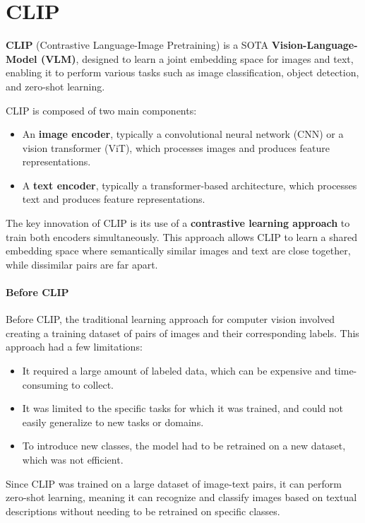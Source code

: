 \section{CLIP}
\textbf{CLIP} (Contrastive Language-Image Pretraining) is a SOTA \textbf{Vision-Language-Model (VLM)}, designed to learn a joint embedding space for images and text, 
enabling it to perform various tasks such as image classification, object detection, and zero-shot learning.

CLIP is composed of two main components:
\begin{itemize}
    \item An \textbf{image encoder}, typically a convolutional neural network (CNN) or a vision transformer (ViT), which processes images and produces feature representations.
    \item A \textbf{text encoder}, typically a transformer-based architecture, which processes text and produces feature representations.
\end{itemize}
The key innovation of CLIP is its use of a \textbf{contrastive learning approach} to train both encoders simultaneously. This approach allows
CLIP to learn a shared embedding space where semantically similar images and text are close together, while dissimilar pairs are far apart.

\paragraph{Before CLIP}
Before CLIP, the traditional learning approach for computer vision involved creating a training dataset of pairs of images and their corresponding labels.
This approach had a few limitations:
\begin{itemize}
    \item It required a large amount of labeled data, which can be expensive and time-consuming to collect.
    \item It was limited to the specific tasks for which it was trained, and could not easily generalize to new tasks or domains.
    \item To introduce new classes, the model had to be retrained on a new dataset, which was not efficient.
\end{itemize}
Since CLIP was trained on a large dataset of image-text pairs, it can perform zero-shot learning, meaning it can recognize and classify images based on textual descriptions without needing to be retrained on specific classes.

